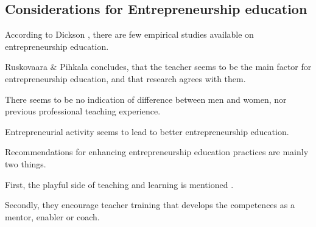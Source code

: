 \subsection{Considerations for Entrepreneurship education}

%

%

According to Dickson \cite{dickson}, there are few empirical studies available on entrepreneurship education.

Ruskovaara \& Pihkala \cite{ruskovaara} concludes, that the teacher seems to be the main factor for entrepreneurship education, and that research agrees with them.

There seems to be no indication of difference between men and women, nor previous professional teaching experience.

Entrepreneurial activity seems to lead to better entrepreneurship education.

Recommendations for enhancing entrepreneurship education practices are mainly two things.

First, the playful side of teaching and learning is mentioned \cite{solomon}.

Secondly, they encourage teacher training that develops the competences as a mentor, enabler or coach.
